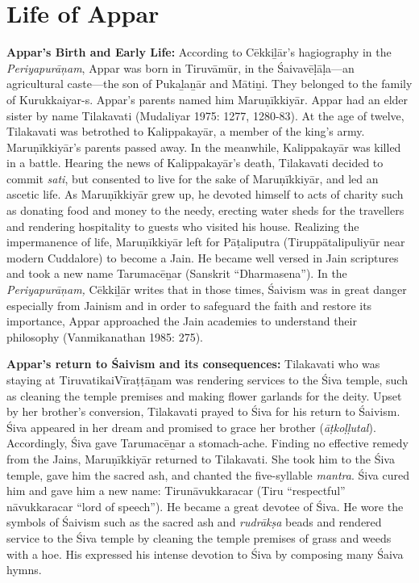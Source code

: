 \section*{Life of Appar}

\textbf{Appar’s Birth and Early Life:} According to Cēkkiḻār’s hagiography in the \textit{Periyapurāņam}, Appar was born in Tiruvāmūr, in the Śaivavēḷāḷa—an agricultural caste—the son of Pukaḻaṉār and Mātiṉi. They belonged to the family of Kurukkaiyar-s. Appar’s parents named him Maruṇīkkiyār. Appar had an elder sister by name Tilakavati (Mudaliyar 1975: 1277, 1280-83). At the age of twelve, Tilakavati was betrothed to Kalippakayār, a member of the king’s army. Maruṇīkkiyār’s parents passed away. In the meanwhile, Kalippakayār was killed in a battle. Hearing the news of Kalippakayār’s death, Tilakavati decided to commit \textit{sati}, but consented to live for the sake of Maruṇīkkiyār, and led an ascetic life. As Maruṇīkkiyār grew up, he devoted himself to acts of charity such as donating food and money to the needy, erecting water sheds for the travellers and rendering hospitality to guests who visited his house. Realizing the impermanence of life, Maruṇīkkiyār left for Pāṭaliputra (Tiruppātalipuliyūr near modern Cuddalore) to become a Jain. He became well versed in Jain scriptures and took a new name Tarumacēṉar (Sanskrit “Dharmasena”). In the \textit{Periyapurāņam, }Cēkkiḻār writes that in those times, Śaivism was in great danger especially from Jainism and in order to safeguard the faith and restore its importance, Appar approached the Jain academies to understand their philosophy (Vanmikanathan 1985: 275). 

\textbf{Appar’s return to Śaivism and its consequences:} Tilakavati who was staying at TiruvatikaiVīraṭṭāṉam was rendering services to the Śiva temple, such as cleaning the temple premises and making flower garlands for the deity. Upset by her brother’s conversion, Tilakavati prayed to Śiva for his return to Śaivism. Śiva appeared in her dream and promised to grace her brother (\textit{āṭkoḷḷutal}). Accordingly, Śiva gave Tarumacēṉar a stomach-ache. Finding no effective remedy from the Jains, Maruṇīkkiyār returned to Tilakavati. She took him to the Śiva temple, gave him the sacred ash, and chanted the five-syllable \textit{mantra}. Śiva cured him and gave him a new name: Tirunāvukkaracar (Tiru “respectful” nāvukkaracar “lord of speech”). He became a great devotee of Śiva. He wore the symbols of Śaivism such as the sacred ash and \textit{rudrākṣa} beads and rendered service to the Śiva temple by cleaning the temple premises of grass and weeds with a hoe. His expressed his intense devotion to Śiva by composing many Śaiva hymns.

